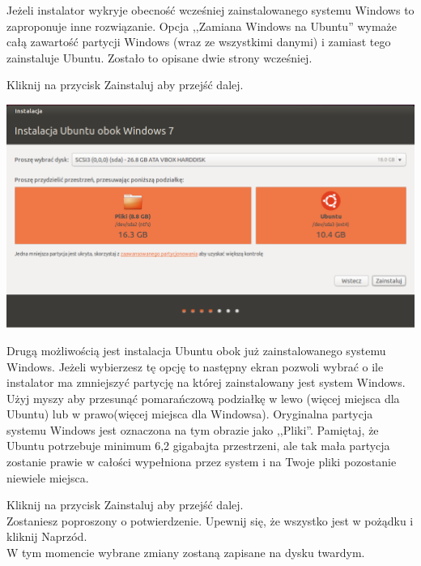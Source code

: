 Jeżeli instalator wykryje obecność wcześniej zainstalowanego systemu Windows to zaproponuje inne rozwiązanie. Opcja ,,Zamiana Windows na Ubuntu'' wymaże całą zawartość partycji Windows (wraz ze wszystkimi danymi) i zamiast tego zainstaluje Ubuntu. Zostało to opisane dwie strony wcześniej.
\begin{flushright}
Kliknij na przycisk \textcolor{ubuntu_orange}{Zainstaluj} aby przejść dalej.
\end{flushright}
\clearpage
\begin{center}
        \includegraphics[width=\linewidth]{images/instalator_partycjonowanie_obok_wondows7_2.png}
\end{center}

Drugą możliwością jest instalacja Ubuntu obok już zainstalowanego systemu Windows. Jeżeli wybierzesz tę opcję to następny ekran pozwoli wybrać o ile instalator ma zmniejszyć partycję na której zainstalowany jest system Windows. Użyj myszy aby przesunąć pomarańczową podziałkę w lewo (więcej miejsca dla Ubuntu) lub w prawo(więcej miejsca dla Windowsa). Oryginalna partycja systemu Windows jest oznaczona na tym obrazie jako ,,Pliki''. Pamiętaj, że Ubuntu potrzebuje minimum 6,2 gigabajta przestrzeni, ale tak mała partycja zostanie prawie w całości wypełniona przez system i na Twoje pliki pozostanie niewiele miejsca.
\begin{flushright}
Kliknij na przycisk \textcolor{ubuntu_orange}{Zainstaluj} aby przejść dalej.\\
Zostaniesz poproszony o potwierdzenie. Upewnij się, że wszystko jest w pożądku i kliknij \textcolor{ubuntu_orange}{Naprzód}.\\
W tym momencie wybrane zmiany zostaną zapisane na dysku twardym.
\end{flushright}
\clearpage
